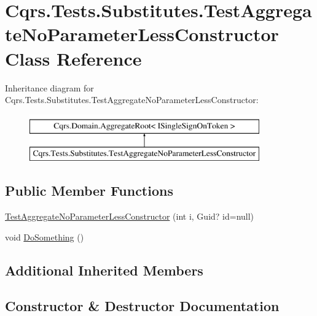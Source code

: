 \hypertarget{classCqrs_1_1Tests_1_1Substitutes_1_1TestAggregateNoParameterLessConstructor}{}\section{Cqrs.\+Tests.\+Substitutes.\+Test\+Aggregate\+No\+Parameter\+Less\+Constructor Class Reference}
\label{classCqrs_1_1Tests_1_1Substitutes_1_1TestAggregateNoParameterLessConstructor}
Inheritance diagram for Cqrs.\+Tests.\+Substitutes.\+Test\+Aggregate\+No\+Parameter\+Less\+Constructor\+:\begin{figure}[H]
\begin{center}
\leavevmode
\includegraphics[height=2.000000cm]{classCqrs_1_1Tests_1_1Substitutes_1_1TestAggregateNoParameterLessConstructor}
\end{center}
\end{figure}
\subsection*{Public Member Functions}
\begin{DoxyCompactItemize}
\item 
\hyperlink{classCqrs_1_1Tests_1_1Substitutes_1_1TestAggregateNoParameterLessConstructor_a4570a8f63619a4edc35f898e087159c6}{Test\+Aggregate\+No\+Parameter\+Less\+Constructor} (int i, Guid? id=null)
\item 
void \hyperlink{classCqrs_1_1Tests_1_1Substitutes_1_1TestAggregateNoParameterLessConstructor_a5a5b9ab40339e27b2d3d0f08bfd24d0e}{Do\+Something} ()
\end{DoxyCompactItemize}
\subsection*{Additional Inherited Members}


\subsection{Constructor \& Destructor Documentation}
\mbox{\label{classCqrs_1_1Tests_1_1Substitutes_1_1TestAggregateNoParameterLessConstructor_a4570a8f63619a4edc35f898e087159c6}} 
